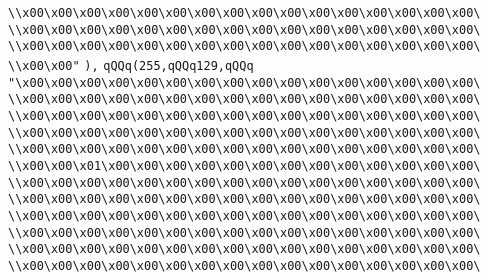 \verb|\\x00\x00\x00\x00\x00\x00\x00\x00\x00\x00\x00\x00\x00\x00\x00\x00\|\newline
\verb|\\x00\x00\x00\x00\x00\x00\x00\x00\x00\x00\x00\x00\x00\x00\x00\x00\|\newline
\verb|\\x00\x00\x00\x00\x00\x00\x00\x00\x00\x00\x00\x00\x00\x00\x00\x00\|\newline
\verb|\\x00\x00"|\newline
\verb|),|\newline
\verb|qQQq(255,qQQq129,qQQq|\newline
\verb|"\x00\x00\x00\x00\x00\x00\x00\x00\x00\x00\x00\x00\x00\x00\x00\x00\|\newline
\verb|\\x00\x00\x00\x00\x00\x00\x00\x00\x00\x00\x00\x00\x00\x00\x00\x00\|\newline
\verb|\\x00\x00\x00\x00\x00\x00\x00\x00\x00\x00\x00\x00\x00\x00\x00\x00\|\newline
\verb|\\x00\x00\x00\x00\x00\x00\x00\x00\x00\x00\x00\x00\x00\x00\x00\x00\|\newline
\verb|\\x00\x00\x00\x00\x00\x00\x00\x00\x00\x00\x00\x00\x00\x00\x00\x00\|\newline
\verb|\\x00\x00\x01\x00\x00\x00\x00\x00\x00\x00\x00\x00\x00\x00\x00\x00\|\newline
\verb|\\x00\x00\x00\x00\x00\x00\x00\x00\x00\x00\x00\x00\x00\x00\x00\x00\|\newline
\verb|\\x00\x00\x00\x00\x00\x00\x00\x00\x00\x00\x00\x00\x00\x00\x00\x00\|\newline
\verb|\\x00\x00\x00\x00\x00\x00\x00\x00\x00\x00\x00\x00\x00\x00\x00\x00\|\newline
\verb|\\x00\x00\x00\x00\x00\x00\x00\x00\x00\x00\x00\x00\x00\x00\x00\x00\|\newline
\verb|\\x00\x00\x00\x00\x00\x00\x00\x00\x00\x00\x00\x00\x00\x00\x00\x00\|\newline
\verb|\\x00\x00\x00\x00\x00\x00\x00\x00\x00\x00\x00\x00\x00\x00\x00\x00\|\newline
